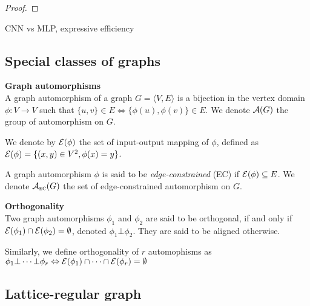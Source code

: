 \begin{proof}
\end{proof}

\begin{remark}
CNN vs MLP, expressive efficiency
\end{remark}




\subsection{Special classes of graphs}


\begin{definition}\textbf{Graph automorphisms}\\
A graph automorphism of a graph $G = \langle V,E \rangle$ is a bijection in the vertex domain $\phi: V \rightarrow V$ such that $\{u,v\} \in E \Leftrightarrow \{\phi(u), \phi(v)\} \in E$. We denote $\mathcal{A}(G)$ the group of automorphism on $G$.

We denote by $\mathcal{E}(\phi)$ the set of input-output mapping of $\phi$, defined as $\mathcal{E}(\phi) = \{ (x,y) \in V^2, \phi(x) = y \}$.

A graph automorphism $\phi$ is said to be \emph{edge-constrained} (EC) if $\mathcal{E}(\phi) \subseteq E$. We denote $\mathcal{A}_{\operatorname{\textsc{ec}}}(G)$ the set of edge-constrained automorphism on $G$.
\end{definition}

\begin{definition}\textbf{Orthogonality}\\
Two graph automorphisms $\phi_1$ and $\phi_2$ are said to be orthogonal, if and only if $\mathcal{E}(\phi_1) \cap \mathcal{E}(\phi_2) = \emptyset$, denoted $\phi_1 \bot \phi_2$. They are said to be aligned otherwise.

Similarly, we define orthogonality of $r$ automophisms as $\phi_1 \bot \cdots \bot \phi_r \Leftrightarrow \mathcal{E}(\phi_1) \cap \cdots \cap \mathcal{E}(\phi_r) = \emptyset$
\end{definition}


\subsection{Lattice-regular graph}


